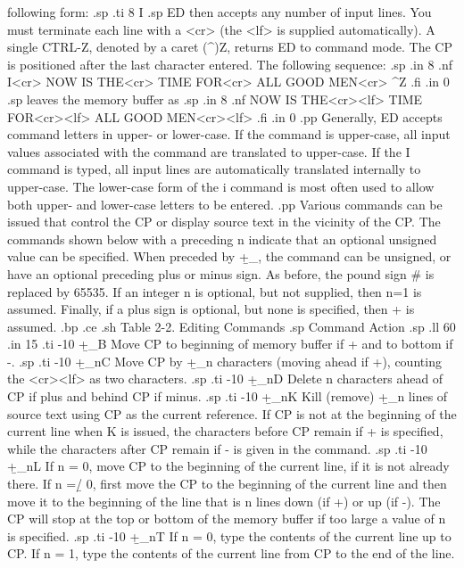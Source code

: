 following form:
.sp
.ti 8
I
.sp
ED then accepts any number of input lines.  You must terminate each line with
a <cr> (the <lf> is supplied automatically).  A single CTRL-Z, denoted
by a caret (^)Z, returns ED to command mode.  The CP is positioned after the
last character entered.  The following sequence:
.sp
.in 8
.nf
I<cr>
NOW IS THE<cr>
TIME FOR<cr>
ALL GOOD MEN<cr>
^Z
.fi
.in 0
.sp
leaves the memory buffer as
.sp
.in 8
.nf
NOW IS THE<cr><lf>
TIME FOR<cr><lf>
ALL GOOD MEN<cr><lf>
.fi
.in 0
.pp
Generally, ED accepts command letters in upper- or lower-case.  If the
command is upper-case, all input values associated with the command are
translated to upper-case.  If the I command is typed, all
input lines are automatically translated internally to upper-case.  The
lower-case form of the i command is most often used to allow both upper- and
lower-case letters to be entered.
.pp
Various commands can be issued that control the CP or display source text
in the vicinity of the CP.  The commands shown below with a preceding n
indicate that an optional unsigned value can be specified.  When preceded
by +\b_, the command can be unsigned, or have an optional preceding plus or
minus sign.  As before, the pound sign # is replaced by 65535.  If an
integer n is optional, but not supplied, then n=1 is assumed.  Finally, if a
plus sign is optional, but none is specified, then + is assumed.
.bp
.ce
.sh
Table 2-2.  Editing Commands
.sp
   Command                       Action
.sp
.ll 60
.in 15
.ti -10
+\b_B        Move CP to beginning of memory buffer if + and to bottom if -.
.sp
.ti -10
+\b_nC       Move CP by +\b_n characters (moving ahead if +), counting the
<cr><lf> as two characters.
.sp
.ti -10
+\b_nD       Delete n characters ahead of CP if plus and behind CP if minus.
.sp
.ti -10
+\b_nK       Kill (remove) +\b_n lines of source text using CP as the
current reference.  If CP is not at the beginning of the current line when K
is issued, the characters before CP remain if + is specified, while the
characters after CP remain if - is given in the command.
.sp
.ti -10
+\b_nL       If n = 0, move CP to the beginning of the current 
line, if it is
not already there.  If n =\b/ 0, first move the CP to the beginning of the
current line and then move it to the beginning of the line that is n lines
down (if +) or up (if -).  The CP will stop at the top or bottom of the
memory buffer if too large a value of n is specified.
.sp
.ti -10
+\b_nT       If n = 0, type the contents of the current line up to CP.  If
n = 1, type the contents of the current line from CP to the end of the line.
